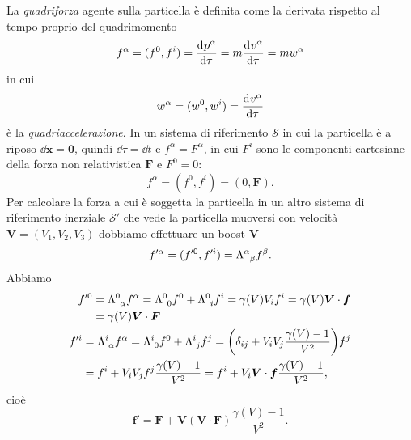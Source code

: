 La \emph{quadriforza} agente sulla particella è definita come
la derivata rispetto al tempo proprio del quadrimomento
\begin{equation}
  f^{\alpha} = (f^{0},f^{i}) =\frac{{\mathop{}\!\mathrm{d}^{}}p^{\alpha}}{\mathop{}\!\mathrm{d} {\tau}^{}} =
  m\frac{{\mathop{}\!\mathrm{d}^{}}v^{\alpha}}{\mathop{}\!\mathrm{d} {\tau}^{}} = mw^{\alpha}
\end{equation}
in cui
\begin{equation}
  w^{\alpha} = (w^{0},w^{i}) =\frac{{\mathop{}\!\mathrm{d}^{}}v^{\alpha}}{\mathop{}\!\mathrm{d} {\tau}^{}}
\end{equation}
è la \emph{quadriaccelerazione}.  In un sistema di
riferimento $\mathcal{S}$ in cui la particella è a riposo $\dd \bm{x} = \bm{0}$,
quindi $\dd \tau = \dd t$ e $f^{\alpha} = F^{\alpha}$, in cui $F^{i}$ sono le
componenti cartesiane della forza non relativistica $\bm{F}$ e $F^{0} = 0$:
\begin{equation}
  f^{\alpha} = (f^{0}, f^{i}) = (0, \bm{F}).
\end{equation}
Per calcolare la forza a cui è soggetta la particella in un altro sistema di
riferimento inerziale $\mathcal{S}'$ che vede la particella muoversi con
velocità $\bm{V} = (V_{1}, V_{2}, V_{3})$ dobbiamo effettuare un boost $\bm{V}$
\begin{equation}
  f'^{\alpha} = (f'^{0}, f'^{i}) = \tensor{\Lambda}{^{\alpha}_{\beta}}f^{\beta}.
\end{equation}
Abbiamo
\begin{subequations}
  \begin{align}
    \begin{split}
      f'^{0} &= \tensor{\Lambda}{^{0}_{\alpha}}f^{\alpha} =
      \tensor{\Lambda}{^{0}_{0}}f^{0} + \tensor{\Lambda}{^{0}_{i}}f^{i} =
      \gamma(V) V_{i}f^{i} = \gamma(V) \bm{V} \cdot \bm{f} \\
      &= \gamma(V) \bm{V} \cdot \bm{F}
    \end{split} \\
    \begin{split}
      f'^{i} &= \tensor{\Lambda}{^{i}_{\alpha}}f^{\alpha} =
      \tensor{\Lambda}{^{i}_{0}}f^{0} + \tensor{\Lambda}{^{i}_{j}}f^{j}
      = \bigg( \delta_{ij} + V_{i}V_{j}\frac{\gamma(V) - 1}{V^{2}} \bigg)f^{j}\\
      &= f^{i} + V_{i}V_{j}f^{j}\frac{\gamma(V) - 1}{V^{2}} = f^{i} + V_{i}
      \bm{V} \cdot \bm{f} \frac{\gamma(V) - 1}{V^{2}},
    \end{split}
  \end{align}
\end{subequations}
cioè
\begin{equation}
  \bm{f}' = \bm{F} + \bm{V}(\bm{V}\cdot\bm{F})\frac{\gamma(V) - 1}{V^{2}}.
\end{equation}

